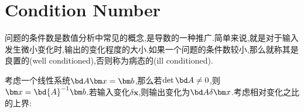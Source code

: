 \section{Condition Number}
问题的条件数是数值分析中常见的概念,是导数的一种推广.简单来说,就是对于输入发生微小变化时,输出的变化程度的大小.如果一个问题的条件数较小,那么就称其是良置的(well conditioned),否则称为病态的(ill conditioned).

考虑一个线性系统$\bd A \bm x = \bm b$,那么若$\det \bd A \ne 0$,则$\bm x = \bd{A}^{-1}\bm b$.若输入变化$\delta \bm x$,则输出变化为$\bd A \delta \bm x$.考虑相对变化之比的上界: